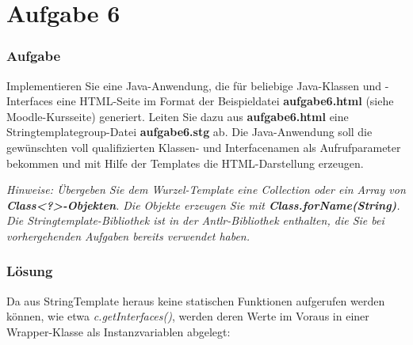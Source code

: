 \chapter{Aufgabe 6}
\label{sec:aufgabe6}

\subsection*{Aufgabe}
Implementieren Sie eine Java-Anwendung, die für beliebige Java-Klassen und
-Interfaces eine HTML-Seite im Format der Beispieldatei \textbf{aufgabe6.html} (siehe Moodle-Kursseite) generiert.
Leiten Sie dazu aus \textbf{aufgabe6.html} eine Stringtemplategroup-Datei \textbf{aufgabe6.stg} ab.
Die Java-Anwendung soll die gewünschten voll qualifizierten Klassen- und Interfacenamen
als Aufrufparameter bekommen und mit Hilfe der Templates die HTML-Darstellung erzeugen.

\textit{
Hinweise:
Übergeben Sie dem Wurzel-Template eine Collection oder ein Array von \textbf{Class<?>-Objekten}.
Die Objekte erzeugen Sie mit \textbf{Class.forName(String)}.
Die Stringtemplate-Bibliothek ist in der Antlr-Bibliothek enthalten,
die Sie bei vorhergehenden Aufgaben bereits verwendet haben.
}

\subsection*{Lösung}

Da aus StringTemplate heraus keine statischen Funktionen aufgerufen werden können, wie etwa \textit{c.getInterfaces()},
werden deren Werte im Voraus in einer Wrapper-Klasse als Instanzvariablen abgelegt:

